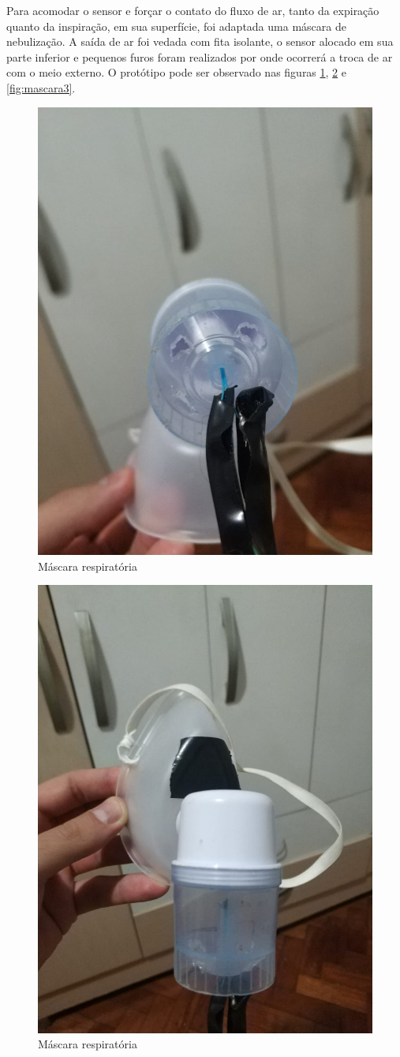 Para acomodar o sensor e forçar o contato do fluxo de ar, tanto da expiração quanto da inspiração, em sua superfície, foi adaptada uma máscara de nebulização. A saída de ar foi vedada com fita isolante, o sensor alocado em sua parte inferior e pequenos furos foram realizados por onde ocorrerá a troca de ar com o meio externo. O protótipo pode ser observado nas figuras \ref{fig:mascara1}, \ref{fig:mascara2} e \ref{fig:mascara3}.

\begin{figure}[h!]
	\begin{center}
		\includegraphics[width=0.5\linewidth]{images/mascara1.jpeg}
		\caption{Máscara respiratória}
		\label{fig:mascara1}
	\end{center}
\end{figure}

\begin{figure}[h!]
	\begin{center}
		\includegraphics[width=0.8\linewidth]{images/mascara2.jpeg}
		\caption{Máscara respiratória}
		\label{fig:mascara2}
	\end{center}
\end{figure}


